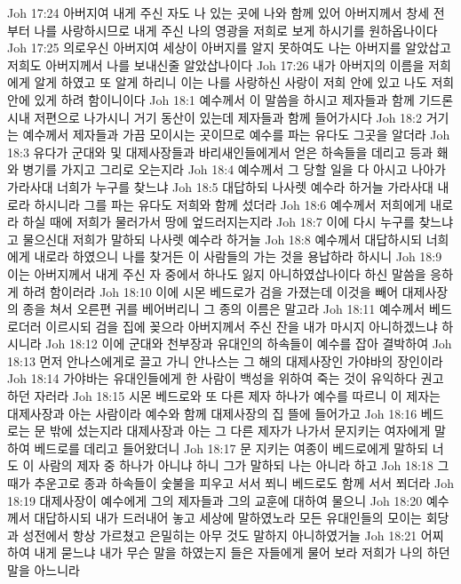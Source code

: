 Joh 17:24  아버지여 내게 주신 자도 나 있는 곳에 나와 함께 있어 아버지께서 창세 전부터 나를 사랑하시므로 내게 주신 나의 영광을 저희로 보게 하시기를 원하옵나이다
Joh 17:25  의로우신 아버지여 세상이 아버지를 알지 못하여도 나는 아버지를 알았삽고 저희도 아버지께서 나를 보내신줄 알았삽나이다
Joh 17:26  내가 아버지의 이름을 저희에게 알게 하였고 또 알게 하리니 이는 나를 사랑하신 사랑이 저희 안에 있고 나도 저희 안에 있게 하려 함이니이다
Joh 18:1  예수께서 이 말씀을 하시고 제자들과 함께 기드론 시내 저편으로 나가시니 거기 동산이 있는데 제자들과 함께 들어가시다
Joh 18:2  거기는 예수께서 제자들과 가끔 모이시는 곳이므로 예수를 파는 유다도 그곳을 알더라
Joh 18:3  유다가 군대와 및 대제사장들과 바리새인들에게서 얻은 하속들을 데리고 등과 홰와 병기를 가지고 그리로 오는지라
Joh 18:4  예수께서 그 당할 일을 다 아시고 나아가 가라사대 너희가 누구를 찾느냐
Joh 18:5  대답하되 나사렛 예수라 하거늘 가라사대 내로라 하시니라 그를 파는 유다도 저희와 함께 섰더라
Joh 18:6  예수께서 저희에게 내로라 하실 때에 저희가 물러가서 땅에 엎드러지는지라
Joh 18:7  이에 다시 누구를 찾느냐고 물으신대 저희가 말하되 나사렛 예수라 하거늘
Joh 18:8  예수께서 대답하시되 너희에게 내로라 하였으니 나를 찾거든 이 사람들의 가는 것을 용납하라 하시니
Joh 18:9  이는 아버지께서 내게 주신 자 중에서 하나도 잃지 아니하였삽나이다 하신 말씀을 응하게 하려 함이러라
Joh 18:10  이에 시몬 베드로가 검을 가졌는데 이것을 빼어 대제사장의 종을 쳐서 오른편 귀를 베어버리니 그 종의 이름은 말고라
Joh 18:11  예수께서 베드로더러 이르시되 검을 집에 꽂으라 아버지께서 주신 잔을 내가 마시지 아니하겠느냐 하시니라
Joh 18:12  이에 군대와 천부장과 유대인의 하속들이 예수를 잡아 결박하여
Joh 18:13  먼저 안나스에게로 끌고 가니 안나스는 그 해의 대제사장인 가야바의 장인이라
Joh 18:14  가야바는 유대인들에게 한 사람이 백성을 위하여 죽는 것이 유익하다 권고하던 자러라
Joh 18:15  시몬 베드로와 또 다른 제자 하나가 예수를 따르니 이 제자는 대제사장과 아는 사람이라 예수와 함께 대제사장의 집 뜰에 들어가고
Joh 18:16  베드로는 문 밖에 섰는지라 대제사장과 아는 그 다른 제자가 나가서 문지키는 여자에게 말하여 베드로를 데리고 들어왔더니
Joh 18:17  문 지키는 여종이 베드로에게 말하되 너도 이 사람의 제자 중 하나가 아니냐 하니 그가 말하되 나는 아니라 하고
Joh 18:18  그 때가 추운고로 종과 하속들이 숯불을 피우고 서서 쬐니 베드로도 함께 서서 쬐더라
Joh 18:19  대제사장이 예수에게 그의 제자들과 그의 교훈에 대하여 물으니
Joh 18:20  예수께서 대답하시되 내가 드러내어 놓고 세상에 말하였노라 모든 유대인들의 모이는 회당과 성전에서 항상 가르쳤고 은밀히는 아무 것도 말하지 아니하였거늘
Joh 18:21  어찌하여 내게 묻느냐 내가 무슨 말을 하였는지 들은 자들에게 물어 보라 저희가 나의 하던 말을 아느니라
